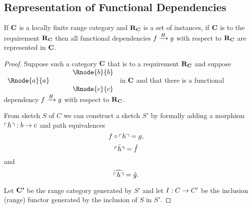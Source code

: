 
\subsection{Representation of Functional Dependencies}

\begin{lemma}
If $\catc$ is a locally finite range category and $\reqtc$ is a set of instances, if $\catc$ is 
 to the requirement $\reqtc$ then
all functional dependencies $\fundep{H}{f}{g}$  with respect to $\reqtc$ are represented in $\catc$.
\end{lemma}
\begin{proof}

Suppose such a category  $\catc$  that  is 
 to a requirement $\reqtc$ and suppose
$
\begin{array}{c p{0.5cm} c  }
             &&   \Rnode{b}{b} \\[0.01cm]
\Rnode{a}{a} &&                \\[0.01cm] 
             &&   \Rnode{c}{c}         
\end{array} 
$
in $\catc$ 
and that there is a functional dependency $\fundep{H}{f}{g}$ with respect to $\reqtc$.



From sketch $S$ of $C$ we can construct a sketch $S'$ by formally 
adding a morphism $\qq{h}: b \morph c$
and path equivalences 
\begin{equation}
\label{hquote}
f \circ \qq{h} = g,
\end{equation} 
\begin{equation}
\label{hquotebar}
\bar{\qq{h}}=\hat{f}
\end{equation} 
and 
\begin{equation}
\label{hquotehat}
\widehat{\qq{h}}=\hat{g}. 
\end{equation}

Let $\catcp$ be the range category generated by $S'$ and
let $I: C \morph C'$ be the inclusion (range) functor 
generated by the inclusion of $S$ in $S'$. 


\end{proof}
